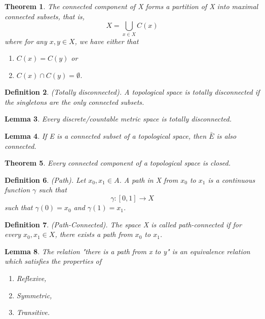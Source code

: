 \documentclass[twoside]{article}
\newcounter{lecnum}
\newtheorem{theorem}{Theorem}[lecnum]
\newtheorem{lemma}[theorem]{Lemma}
\newtheorem{definition}[theorem]{Definition}
\begin{document}
\begin{theorem}The connected component of X forms a partition of X into maximal connected subsets, that is, 
$$
X = \bigcup_{x \in X}C(x)
$$
where for any $x, y \in X$, we have either that
\begin{enumerate}
\item $C(x) = C(y)$ or
\item $C(x) \cap C(y) = \emptyset$.
\end{enumerate}
\end{theorem}

\begin{definition}(Totally disconnected). A topological space is totally disconnected if the singletons are the only connected subsets.
\end{definition}

\begin{lemma}Every discrete/countable metric space is totally disconnected.
\end{lemma}

\begin{lemma}If E is a connected subset of a topological space, then $\bar{E}$ is also connected.
\end{lemma}

\begin{theorem}Every connected component of a topological space is closed.
\end{theorem}

\begin{definition}(Path). Let $x_0, x_1 \in A$. A path in X from $x_0$ to $x_1$ is a continuous function $\gamma$ such that 
$$
\gamma:[0, 1] \rightarrow X
$$
such that $\gamma(0) = x_0$ and $\gamma(1) = x_1$.
\end{definition}

\begin{definition}(Path-Connected). The space X is called path-connected if for every $x_0, x_1 \in X$, there exists a path from $x_0$ to $x_1$.
\end{definition}

\begin{lemma}The relation "there is a path from x to y" is an equivalence relation which satisfies the properties of
\begin{enumerate}
\item Reflexive,
\item Symmetric,
\item Transitive.
\end{enumerate}
\end{lemma}
\end{document}
